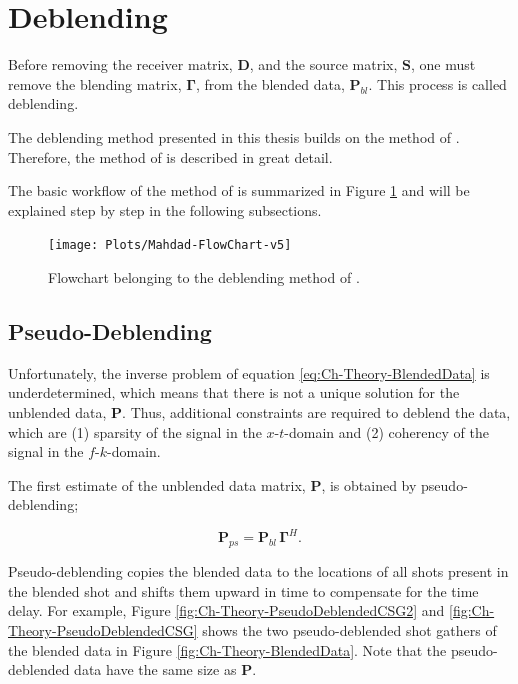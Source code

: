 \section{Deblending} \label{sec:MahdadMethod}

Before removing the receiver matrix, $\mathbf{D}$, and the source matrix, $\mathbf{S}$, one must remove  the blending matrix, $\mathbf{\Gamma}$, from the blended data, $\mathbf{P}_{bl}$. This process is called deblending.

The deblending method presented in this thesis builds on the method of \citet{Mahdad-Deblending-Method}. Therefore, the method of \citet{Mahdad-Deblending-Method} is described in great detail.

The basic workflow of the method of \citet{Mahdad-Deblending-Method} is summarized in Figure \ref{fig:Ch-Theory-FlowChart} and will be explained step by step in the following subsections. 

\begin{figure}
	\centering
	\texttt{[image: Plots/Mahdad-FlowChart-v5]}
	\caption{Flowchart belonging to the deblending method of \citet{Mahdad-Deblending-Method}.}
	\label{fig:Ch-Theory-FlowChart}
\end{figure}

\subsection{Pseudo-Deblending}

Unfortunately, the inverse problem of equation \ref{eq:Ch-Theory-BlendedData} is underdetermined, which means that there is not a unique solution for the unblended data, $\mathbf{P}$. Thus, additional constraints are required to deblend the data, which are (1) sparsity of the signal in the $x$-$t$-domain and (2) coherency of the signal in the $f$-$k$-domain. 

The first estimate of the unblended data matrix, $\mathbf{P}$, is obtained by pseudo-deblending;

\begin{equation}
	\mathbf{P}_{ps} = \mathbf{P}_{bl} \, \mathbf{\Gamma}^H.
	\label{eq:Ch-Theory-PseudoDeblended}
\end{equation}

Pseudo-deblending copies the blended data to the locations of all shots present in the blended shot and shifts them  upward in time to compensate for the time delay. For example, Figure \ref{fig:Ch-Theory-PseudoDeblendedCSG2} and \ref{fig:Ch-Theory-PseudoDeblendedCSG} shows the two pseudo-deblended shot gathers of the blended data in Figure \ref{fig:Ch-Theory-BlendedData}. Note that the pseudo-deblended data have the same size as $\mathbf{P}$.


